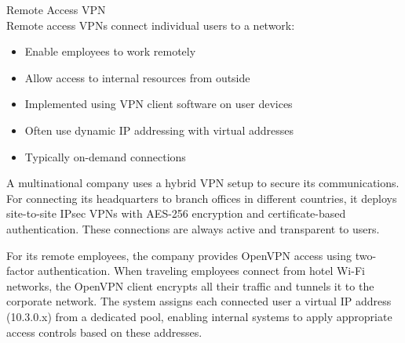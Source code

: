 \begin{concept}{Remote Access VPN}\\
Remote access VPNs connect individual users to a network:
\begin{itemize}
    \item Enable employees to work remotely
    \item Allow access to internal resources from outside
    \item Implemented using VPN client software on user devices
    \item Often use dynamic IP addressing with virtual addresses
    \item Typically on-demand connections
\end{itemize}
\end{concept}

\begin{example}
A multinational company uses a hybrid VPN setup to secure its communications. For connecting its headquarters to branch offices in different countries, it deploys site-to-site IPsec VPNs with AES-256 encryption and certificate-based authentication. These connections are always active and transparent to users.

For its remote employees, the company provides OpenVPN access using two-factor authentication. When traveling employees connect from hotel Wi-Fi networks, the OpenVPN client encrypts all their traffic and tunnels it to the corporate network. The system assigns each connected user a virtual IP address (10.3.0.x) from a dedicated pool, enabling internal systems to apply appropriate access controls based on these addresses.
\end{example}